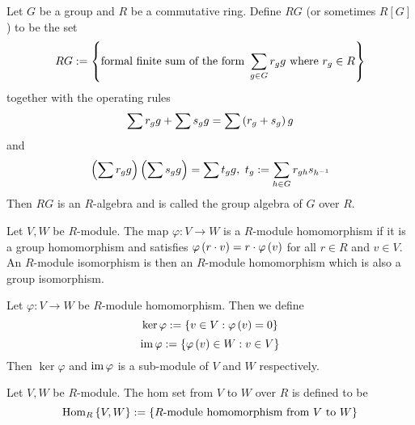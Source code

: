 \medskip

\begin{ex}  \label{ex: group algebra}
    Let $G$ be a group and $R$ be a commutative ring. Define $RG$ (or sometimes $R[G]$) to be the set
    \[RG:= \left\{\text{formal finite sum of the form }\sum_{g\in G}r_g g \text{ where }r_g\in R\right\}\]
    together with the operating rules
    \[\sum r_g g + \sum s_g g = \sum\left(r_g+s_g\right)g\]
    and 
    \[\left(\sum r_g g\right)\left(\sum s_g g\right) = \sum t_g g,\ t_g := \sum_{h\in G}r_{gh}s_{h^{-1}}\]
    Then $RG$ is an $R$-algebra and is called the group algebra of $G$ over $R$.
\end{ex}

\medskip

\begin{defn} 
    Let $V,W$ be $R$-module. The map $\varphi:V\to W$ is a $R$-module homomorphism if it is a group homomorphism and satisfies $\varphi\left(r\cdot v\right) = r\cdot \varphi\left(v\right)$ for all $r\in R$ and $v\in V$. An $R$-module isomorphism is then an $R$-module homomorphism which is also a group isomorphism.
\end{defn}

\medskip

\begin{ex} 
    Let $\varphi:V\to W$ be $R$-module homomorphism. Then we define
    \[\ker\varphi := \left\{v\in V:\varphi\left(v\right)=0\right\}\]
    \[\operatorname{im} \varphi := \left\{\varphi\left(v\right)\in W:v\in V\right\}\]
    Then $\ker \varphi$ and $\operatorname{im}\varphi$ is a sub-module of $V$ and $W$ respectively.
\end{ex}

\medskip


\begin{ex}
    Let $V,W$ be $R$-module. The hom set from $V$ to $W$ over $R$ is defined to be
    \[\operatorname{Hom}_R\left\{V,W\right\}:=\left\{\text{$R$-module homomorphism from $V$ to $W$}\right\}\]
\end{ex}

\medskip


